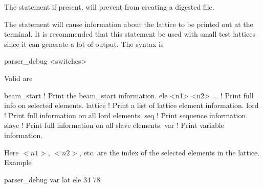The  statement if present, will prevent \bmad from 
creating a digested file. 

The  statement will cause information about the
lattice to be printed out at the terminal. It is recommended that this
statement be used with small test lattices since it can generate a lot
of output. The syntax is
\begin{example}
  parser_debug <switches>
\end{example}
Valid  are
\begin{example}
  beam_start          ! Print the beam_start information.
  ele <n1> <n2> ...   ! Print full info on selected elements.
  lattice             ! Print a list of lattice element information.
  lord                ! Print full information on all lord elements.
  seq                 ! Print sequence information.
  slave               ! Print full information on all slave elements.
  var                 ! Print variable information.
\end{example}
Here $<n1>$, $<n2>$, etc. are the index of the selected elements in
the lattice.  Example
\begin{example}
  parser_debug var lat ele 34 78
\end{example}




